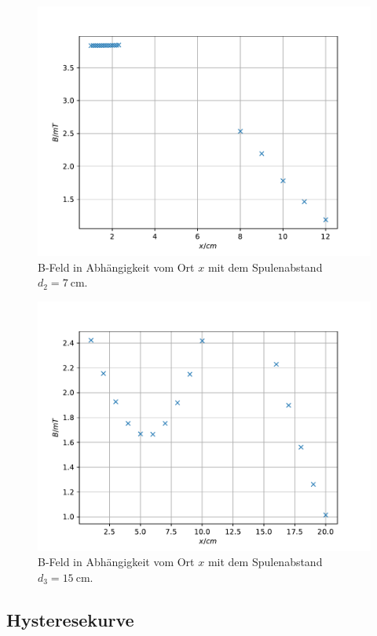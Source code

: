 \begin{figure}
\centering
\includegraphics{content/data/plot_helmholtz2.pdf}
\caption{B-Feld in Abhängigkeit vom Ort $x$ mit dem Spulenabstand $d_2=\SI{7}{\centi\metre}$.}
\label{fig:helm2}
\end{figure}

\begin{figure}
\centering
\includegraphics{content/data/plot_helmholtz3.pdf}
\caption{B-Feld in Abhängigkeit vom Ort $x$ mit dem Spulenabstand $d_3=\SI{15}{\centi\metre}$.}
\label{fig:helm3}
\end{figure}

\FloatBarrier
\subsection{Hysteresekurve}

